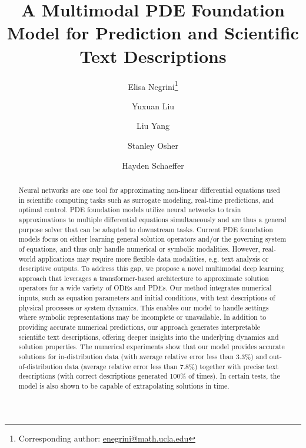 \documentclass{article}
\title{A Multimodal PDE Foundation Model for Prediction and Scientific Text Descriptions}
\author[1]{Elisa Negrini\thanks{Corresponding author: \href{mailto:enegrini@math.ucla.edu}{enegrini@math.ucla.edu}}}
\author[1]{Yuxuan Liu}
\author[2]{Liu Yang}
\author[1]{Stanley Osher}
\author[1]{Hayden Schaeffer}
\affil[1]{Department of Mathematics, University of California Los Angeles, Los Angeles, CA}
\affil[2]{Department of Mathematics, National University of Singapore, Singapore}
\date{}
\begin{document}
\maketitle
\begin{abstract}
    Neural networks are one tool for approximating non-linear differential equations used in scientific computing tasks such as surrogate modeling, real-time predictions, and optimal control. PDE foundation models utilize neural networks to train approximations to multiple differential equations simultaneously and are thus a general purpose solver that can be adapted to downstream tasks.  Current PDE foundation models focus on either learning general solution operators and/or the governing system of equations, and thus only handle numerical or symbolic modalities. However, real-world applications may require more flexible data modalities, e.g. text analysis or descriptive outputs. To address this gap, we propose a novel multimodal deep learning approach that leverages a transformer-based architecture to approximate solution operators for a wide variety of ODEs and PDEs. Our method integrates numerical inputs, such as equation parameters and initial conditions, with text descriptions of physical processes or system dynamics. This enables our model to handle settings where symbolic representations may be incomplete or unavailable. In addition to providing accurate numerical predictions, our approach generates interpretable scientific text descriptions, offering deeper insights into the underlying dynamics and solution properties. The numerical experiments show that our model provides accurate solutions for in-distribution data (with average relative error less than 3.3\%) and out-of-distribution data (average relative error less than 7.8\%) together with precise text descriptions (with correct descriptions generated 100\% of times). In certain tests, the model is also shown to be capable of extrapolating solutions in time. 
\end{abstract}
\end{document}
